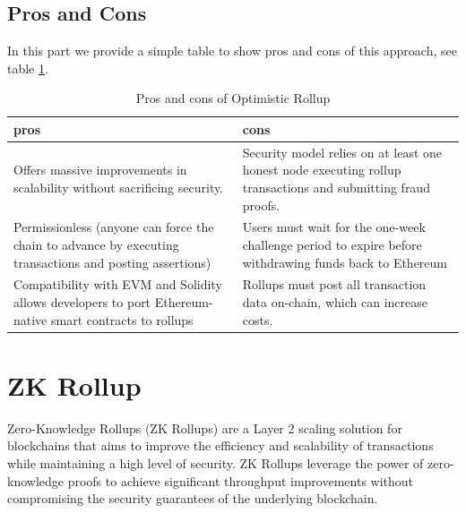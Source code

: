 \documentclass{report}
\begin{document}
\subsection{Pros and Cons}
In this part we provide a simple table to show pros and cons of this approach, see table \ref{table:t1}.
\begin{table}[htbp]
	\centering
	\captionsetup{justification=centering}
	\caption[position=above]{Pros and cons of Optimistic Rollup}
	\begin{tabular}{|>{\centering\arraybackslash}p{8cm}|>{\centering\arraybackslash}p{8cm}|}
		\hline
		\textbf{pros} & \textbf{cons}\\
		\hline
		Offers massive improvements in scalability without sacrificing security.
		 & Security model relies on at least one honest node executing rollup transactions and submitting fraud proofs.\\
		\hline
		Permissionless (anyone can force the chain to advance by executing transactions and posting assertions) & Users must wait for the one-week challenge period to expire before withdrawing funds back to Ethereum \\
		\hline
		Compatibility with EVM and Solidity allows developers to port Ethereum-native smart contracts to rollups & Rollups must post all transaction data on-chain, which can increase costs. \\
		\hline
	\end{tabular}
	\label{table:t1}
\end{table}
\section{ZK Rollup}
Zero-Knowledge Rollups (ZK Rollups) are a Layer 2 scaling solution for blockchains that aims to improve the efficiency and scalability of transactions while maintaining a high level of security. ZK Rollups leverage the power of zero-knowledge proofs to achieve significant throughput improvements without compromising the security guarantees of the underlying blockchain.
\end{document}
